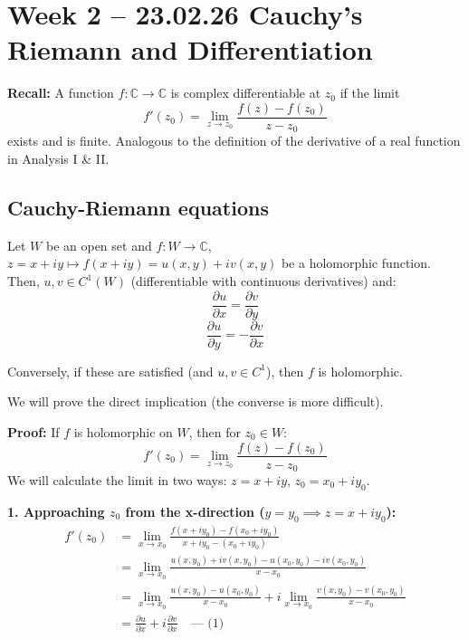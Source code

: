 \section{Week 2 -- 23.02.26 Cauchy's Riemann and Differentiation}

\textbf{Recall:} A function $f: \mathbb{C} \rightarrow \mathbb{C}$ is complex differentiable at $z_{0}$ if the limit
$$ f'(z_{0}) = \lim_{z \rightarrow z_{0}} \frac{f(z) - f(z_{0})}{z - z_{0}} $$
exists and is finite. Analogous to the definition of the derivative of a real function in Analysis I \& II.

\subsection{Cauchy-Riemann equations}

\begin{theorem}
Let $W$ be an open set and $f: W \rightarrow \mathbb{C}$, $z = x + iy \mapsto f(x+iy) = u(x,y) + iv(x,y)$ be a holomorphic function. Then, $u, v \in C^{1}(W)$ (differentiable with continuous derivatives) and:
$$ \frac{\partial u}{\partial x} = \frac{\partial v}{\partial y} $$
$$ \frac{\partial u}{\partial y} = -\frac{\partial v}{\partial x} $$

Conversely, if these are satisfied (and $u, v \in C^1$), then $f$ is holomorphic.
\end{theorem}
We will prove the direct implication (the converse is more difficult).

\textbf{Proof:} If $f$ is holomorphic on $W$, then for $z_0 \in W$:
$$ f'(z_{0}) = \lim_{z \rightarrow z_{0}} \frac{f(z) - f(z_{0})}{z - z_{0}} $$
We will calculate the limit in two ways: $z = x + iy$, $z_{0} = x_{0} + iy_{0}$.

\textbf{1. Approaching $z_{0}$ from the x-direction ($y = y_0 \implies z = x + iy_{0}$):}
\begin{align*}
f'(z_{0}) &= \lim_{x \rightarrow x_{0}} \frac{f(x + iy_{0}) - f(x_{0} + iy_{0})}{x + iy_{0} - (x_{0} + iy_{0})} \\
&= \lim_{x \rightarrow x_{0}} \frac{u(x, y_{0}) + iv(x, y_{0}) - u(x_{0}, y_{0}) - iv(x_{0}, y_{0})}{x - x_{0}} \\
&= \lim_{x \rightarrow x_{0}} \frac{u(x, y_{0}) - u(x_{0}, y_{0})}{x - x_{0}} + i \lim_{x \rightarrow x_{0}} \frac{v(x, y_{0}) - v(x_{0}, y_{0})}{x - x_{0}} \\
&= \frac{\partial u}{\partial x} + i \frac{\partial v}{\partial x} \quad \text{--- (1)}
\end{align*}

